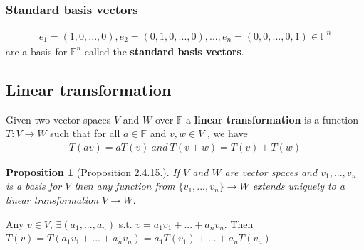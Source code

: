 \documentclass[11pt,a4paper]{article}
\newtheorem{proposition}{Proposition}
\begin{document}
\subsubsection{Standard basis vectors}
\begin{equation}
    \begin{aligned}
        e_1=(1,0,...,0),e_2=(0,1,0,...,0),...,e_n=(0,0,...,0,1)\in \mathbb{F}^n
    \end{aligned}
    \nonumber
\end{equation}
are a basis for $\mathbb{F}^n$ called the \textbf{standard basis vectors}.
\subsection{Linear transformation}
Given two vector spaces $V$ and $W$ over $\mathbb{F}$ a \textbf{linear transformation} is a function $T : V \rightarrow	 W$ such that
for all $a \in \mathbb{F}$ and $v,w \in V$ , we have
\begin{equation}
    \begin{aligned}
        T(av)=aT(v)\ and\ T(v+w)=T(v)+T(w)
    \end{aligned}
    \nonumber
\end{equation}
\begin{proposition}[Proposition 2.4.15.]
    If $V$ and $W$ are vector spaces and $v_1,...,v_n$ is a basis for $V$ then any function
    from $\{v_1,...,v_n\}\rightarrow W$ extends \textit{uniquely} to a linear transformation $V \rightarrow W$.
\end{proposition}
Any $v\in V$, $\exists (a_1,...,a_n)$ s.t. $v=a_1 v_1+...+a_n v_n$. Then $T(v)=T(a_1 v_1+...+a_n v_n)=a_1T(v_1)+...+a_nT(v_n)$\\
\end{document}
